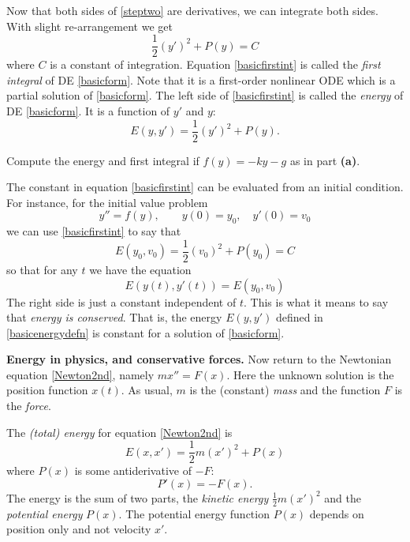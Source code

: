 \documentclass[12pt]{article}
\theoremstyle{definition}
\begin{document}
Now that both sides of \eqref{steptwo} are derivatives, we can integrate both sides.  With slight re-arrangement we get
\begin{equation}
  \frac{1}{2} (y')^2 + P(y) = C  \label{basicfirstint}
\end{equation}
where $C$ is a constant of integration.  Equation \eqref{basicfirstint} is called the \emph{first integral} of DE \eqref{basicform}.  Note that it is a first-order nonlinear ODE which is a partial solution of \eqref{basicform}.  The left side of \eqref{basicfirstint} is called the \emph{energy} of DE \eqref{basicform}.  It is a function of $y'$ and $y$:
\begin{equation}
  E(y,y') = \frac{1}{2} (y')^2 + P(y).  \label{basicenergydefn}
\end{equation}

\begin{exerpart}
Compute the energy and first integral if $f(y)=-ky-g$ as in part \textbf{(a)}.
\end{exerpart}

The constant in equation \eqref{basicfirstint} can be evaluated from an initial condition.  For instance, for the initial value problem
    $$y''=f(y), \qquad y(0)=y_0, \quad y'(0)=v_0$$
we can use \eqref{basicfirstint} to say that
    $$E(y_0,v_0) = \frac{1}{2} (v_0)^2 + P(y_0) = C$$
so that for any $t$ we have the equation
    $$E(y(t),y'(t)) = E(y_0,v_0)$$
The right side is just a constant independent of $t$.  This is what it means to say that \emph{energy is conserved}.  That is, the energy $E(y,y')$ defined in \eqref{basicenergydefn} is constant for a solution of \eqref{basicform}.

\medskip
\textbf{Energy in physics, and conservative forces.}  Now return to the Newtonian equation \eqref{Newton2nd}, namely $m x'' = F(x)$.  Here the unknown solution is the position function $x(t)$.  As usual, $m$ is the (constant) \emph{mass} and the function $F$ is the \emph{force}.

The \emph{(total) energy} for equation \eqref{Newton2nd} is
\begin{equation}
  E(x,x') = \frac{1}{2} m (x')^2 + P(x)  \label{energydefn}
\end{equation}
where $P(x)$ is some antiderivative of $-F$:
\begin{equation}
P'(x)=-F(x).  \label{potentialfunction}
\end{equation}
The energy is the sum of two parts, the \emph{kinetic energy} $\frac{1}{2} m (x')^2$ and the \emph{potential energy} $P(x)$.  The potential energy function $P(x)$ depends on position only and not velocity $x'$.
\end{document}
